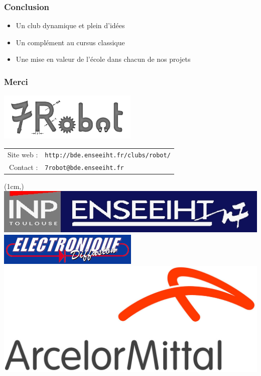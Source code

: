 \documentclass[9pt]{beamer}
\newcommand\bottom[1]{%
  \begin{textblock*}{\textwidth}(1cm,\textheight-1cm)%
    #1
  \end{textblock*}
}
\begin{document}
\begin{frame}
	\frametitle{Conclusion}
	
	\begin{itemize}
		\item Un club dynamique et plein d'idées
		\item Un complément au cursus classique	
		\item Une mise en valeur de l'école dans chacun de nos projets
	\end{itemize}
\end{frame}

\begin{frame}
	\frametitle{Merci}
	
	\begin{center}
		\includegraphics[width=0.5\textwidth]{logo}
	\end{center}
	
	\begin{tabular}{ r l }
		Site web : &	\texttt{http://bde.enseeiht.fr/clubs/robot/} \\
		Contact :  &	\texttt{7robot@bde.enseeiht.fr} \\
	\end{tabular}
	


	\begin{center}
		\bottom{\includegraphics[height=0.08\textheight]{logo_n7}
				\hspace{0.2cm}
				\includegraphics[height=0.08\textheight]{logo_ed}
			    \hspace{0.2cm}
				\includegraphics[height=0.08\textheight]{arcelor-mittal}
		}
	\end{center}

\end{frame}
\end{document}
